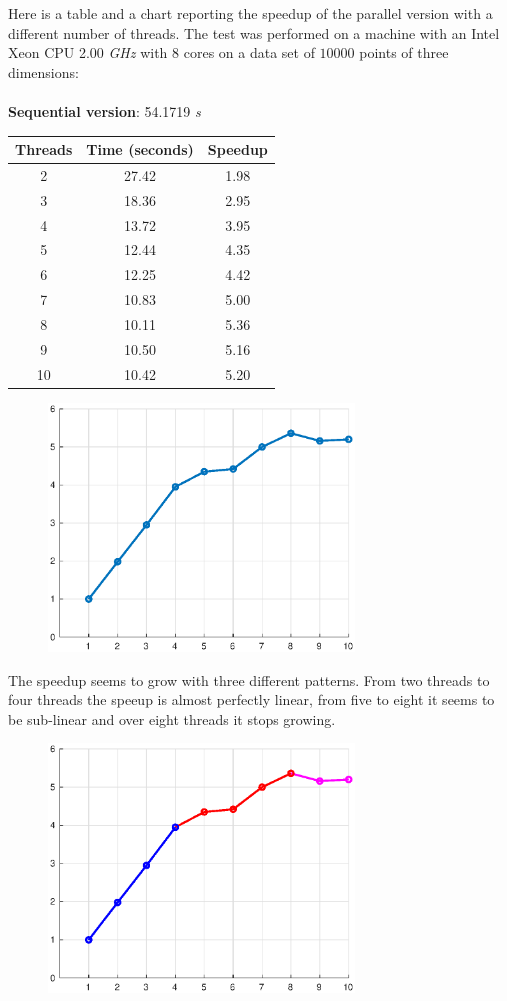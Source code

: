 \documentclass[10pt,twocolumn,letterpaper]{article}
\begin{document}
Here is a table and a chart reporting the speedup of the parallel version with a different number of threads. The test was performed on a machine with an Intel Xeon CPU 2.00 \textit{GHz} with 8 cores on a data set of $10000$ points of three dimensions:
\\
\\
\textbf{Sequential version}: 54.1719 \textit{s}
\\

\begin{table}[H]
\centering
\begin{tabular}{ccc}
\hline
 \textbf{Threads} & \textbf{Time} (seconds) & \textbf{Speedup} \\
\hline
2 & 27.42 & 1.98 \\
3 & 18.36 & 2.95 \\
4 & 13.72 & 3.95 \\
5 & 12.44 & 4.35 \\
6 & 12.25 & 4.42 \\
7 & 10.83 & 5.00 \\
8 & 10.11 & 5.36 \\
9 & 10.50 & 5.16 \\
10 & 10.42 & 5.20 \\
\hline
\end{tabular}
\end{table}

\begin{figure}[H]
\centering
\includegraphics[width=3.2in]{speedup.eps}
\end{figure}

The speedup seems to grow with three different patterns. From two threads to four threads the speeup is almost perfectly linear, from five to eight it seems to be sub-linear and over eight threads it stops growing.

\begin{figure}[H]
\centering
\includegraphics[width=3.2in]{speedup_colors.eps}
\end{figure}
\end{document}
